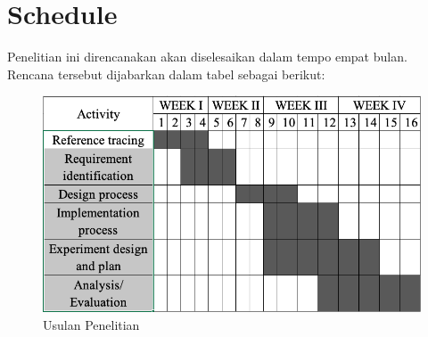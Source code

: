 \section{Schedule}


Penelitian ini direncanakan akan diselesaikan dalam tempo empat bulan. Rencana tersebut dijabarkan dalam tabel sebagai berikut:








\begin{figure}[H]
	\centering
	\includegraphics[width=0.9\linewidth]{figure/Chart-ThesisQ.png}
	\caption{Usulan Penelitian}
	\label{fig:chart-thesisq}
\end{figure}







